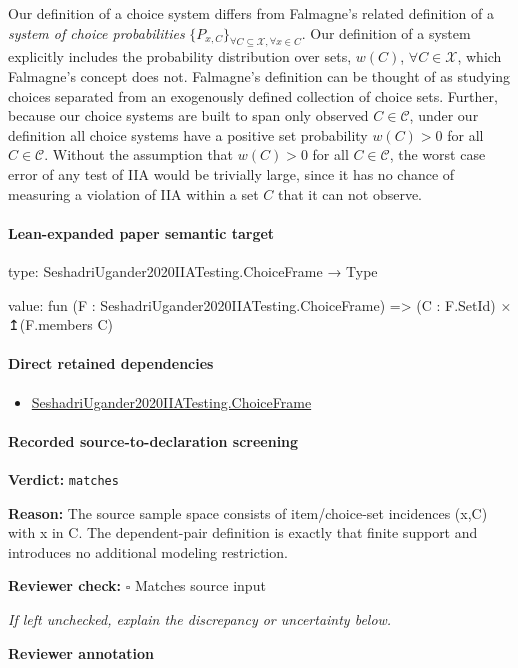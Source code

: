 \documentclass[10pt]{article}
\newcommand{\reviewerbox}{%
  \par\noindent\fbox{\parbox{0.96\linewidth}{\rule{0pt}{0.38in}}}\par
}
\newcommand{\reviewmatch}[1]{%
  \par\noindent\textbf{Reviewer check:} $\square$\; #1\par
  \noindent\emph{If left unchecked, explain the discrepancy or uncertainty below.}\par
}
\begin{document}
\begin{ReviewVerbatim}
	Our definition of a choice system differs from Falmagne's \cite{falmagne1978representation,barbera1986falmagne} related definition of a {\it system of choice probabilities} $\{P_{x,C}\}_{\forall C \subseteq \mathcal X, \forall x \in C}$. Our definition of a system explicitly includes the probability distribution over sets, $w(C)$, $\forall C \in \mathcal X$, which Falmagne's concept does not. Falmagne's definition can be thought of as studying choices separated from an exogenously defined collection of choice sets. Further, because our choice systems are built to span only observed $C \in \mathcal{C}$, under our definition all choice systems have a positive set probability $w(C)>0$ for all $C \in \mathcal{C}$. Without the assumption that $w(C)>0$ for all $C \in \mathcal{C}$, the worst case error of any test of IIA would be trivially large, since it has no chance of measuring a violation of IIA within a set $C$ that it can not observe.
\end{ReviewVerbatim}



\paragraph{Lean-expanded paper semantic target}
\begin{ReviewVerbatim}
type:
SeshadriUgander2020IIATesting.ChoiceFrame → Type

value:
fun (F : SeshadriUgander2020IIATesting.ChoiceFrame) => (C : F.SetId) × ↥(F.members C)
\end{ReviewVerbatim}

\paragraph{Direct retained dependencies}
\begin{itemize}\raggedright
\item \hyperlink{paper-prerequisite-0b24d39c6f4d1898}{Seshadri\allowbreak{}Ugander2020\allowbreak{}IIA\allowbreak{}Testing.\allowbreak{}Choice\allowbreak{}Frame}
\end{itemize}
\paragraph{Recorded source-to-declaration screening}
\textbf{Verdict:} \texttt{matches}
\\
{\raggedright
\textbf{Reason:} The source sample space consists of item/\allowbreak{}choice-\allowbreak{}set incidences (x,C) with x in C.\allowbreak{} The dependent-\allowbreak{}pair definition is exactly that finite support and introduces no additional modeling restriction.\allowbreak{}
\par}
\reviewmatch{Matches source input}
\noindent\textbf{Reviewer annotation}\par
\reviewerbox
\clearpage
\hypertarget{paper-prerequisite-327de24bc89b726a}{}
\end{document}

